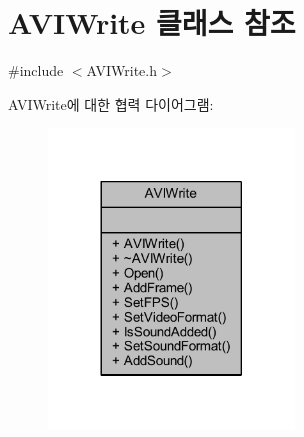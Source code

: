 \hypertarget{class_a_v_i_write}{}\section{A\+V\+I\+Write 클래스 참조}
\label{class_a_v_i_write}


{\ttfamily \#include $<$A\+V\+I\+Write.\+h$>$}



A\+V\+I\+Write에 대한 협력 다이어그램\+:\nopagebreak
\begin{figure}[H]
\begin{center}
\leavevmode
\includegraphics[width=185pt]{class_a_v_i_write__coll__graph}
\end{center}
\end{figure}
